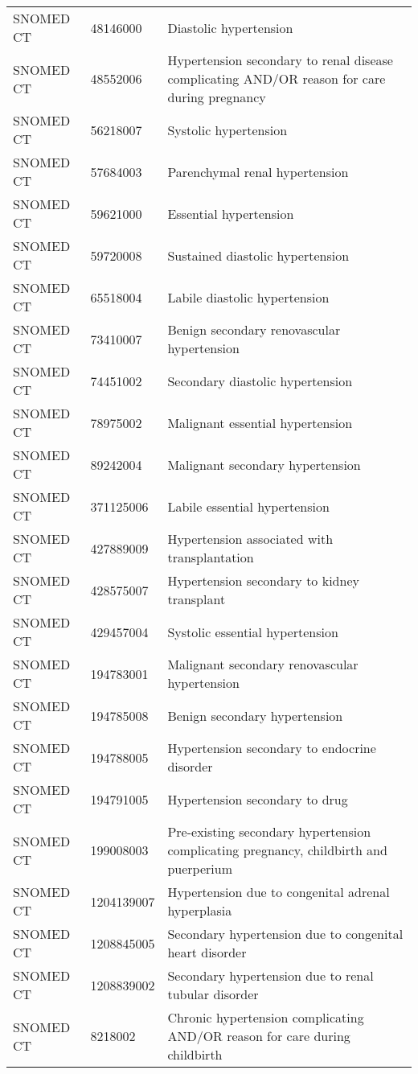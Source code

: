 \begin{longtable}{p{}p{}p{}}
  SNOMED CT & 48146000 & Diastolic hypertension \\ 
  SNOMED CT & 48552006 & Hypertension secondary to renal disease complicating AND/OR reason for care during pregnancy \\ 
  SNOMED CT & 56218007 & Systolic hypertension \\ 
  SNOMED CT & 57684003 & Parenchymal renal hypertension \\ 
  SNOMED CT & 59621000 & Essential hypertension \\ 
  SNOMED CT & 59720008 & Sustained diastolic hypertension \\ 
  SNOMED CT & 65518004 & Labile diastolic hypertension \\ 
  SNOMED CT & 73410007 & Benign secondary renovascular hypertension \\ 
  SNOMED CT & 74451002 & Secondary diastolic hypertension \\ 
  SNOMED CT & 78975002 & Malignant essential hypertension \\ 
  SNOMED CT & 89242004 & Malignant secondary hypertension \\ 
  SNOMED CT & 371125006 & Labile essential hypertension \\ 
  SNOMED CT & 427889009 & Hypertension associated with transplantation \\ 
  SNOMED CT & 428575007 & Hypertension secondary to kidney transplant \\ 
  SNOMED CT & 429457004 & Systolic essential hypertension \\ 
  SNOMED CT & 194783001 & Malignant secondary renovascular hypertension \\ 
  SNOMED CT & 194785008 & Benign secondary hypertension \\ 
  SNOMED CT & 194788005 & Hypertension secondary to endocrine disorder \\ 
  SNOMED CT & 194791005 & Hypertension secondary to drug \\ 
  SNOMED CT & 199008003 & Pre-existing secondary hypertension complicating pregnancy, childbirth and puerperium \\ 
  SNOMED CT & 1204139007 & Hypertension due to congenital adrenal hyperplasia \\ 
  SNOMED CT & 1208845005 & Secondary hypertension due to congenital heart disorder \\ 
  SNOMED CT & 1208839002 & Secondary hypertension due to renal tubular disorder \\ 
  SNOMED CT & 8218002 & Chronic hypertension complicating AND/OR reason for care during childbirth \\ 

\end{longtable}
